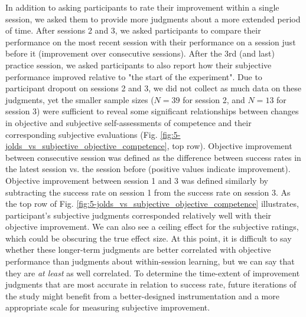 In addition to asking participants to rate their improvement within a single session, we asked them to provide more judgments about a more extended period of time. After sessions 2 and 3, we asked participants to compare their performance on the most recent session with their performance on a session just before it (improvement over consecutive sessions). After the 3rd (and last) practice session, we asked participants to also report how their subjective performance improved relative to "the start of the experiment". Due to participant dropout on sessions 2 and 3, we did not collect as much data on these judgments, yet the smaller sample sizes ($N=39$ for session 2, and $N=13$ for session 3) were sufficient to reveal some significant relationships between changes in objective and subjective self-assessments of competence and their corresponding subjective evaluations (Fig. \ref{fig:5-jolds_vs_subjective_objective_competence}, top row). Objective improvement between consecutive session was defined as the difference between success rates in the latest session vs. the session before (positive values indicate improvement). Objective improvement between session 1 and 3 was defined similarly by subtracting the success rate on session 1 from the success rate on session 3. As the top row of Fig. \ref{fig:5-jolds_vs_subjective_objective_competence} illustrates, participant's subjective judgments corresponded relatively well with their objective improvement. We can also see a ceiling effect for the subjective ratings, which could be obscuring the true effect size. At this point, it is difficult to say whether these longer-term judgments are better correlated with objective performance than judgments about within-session learning, but we can say that they are \emph{at least} as well correlated. To determine the time-extent of improvement judgments that are most accurate in relation to success rate, future iterations of the study might benefit from a better-designed instrumentation and a more appropriate scale for measuring subjective improvement.

